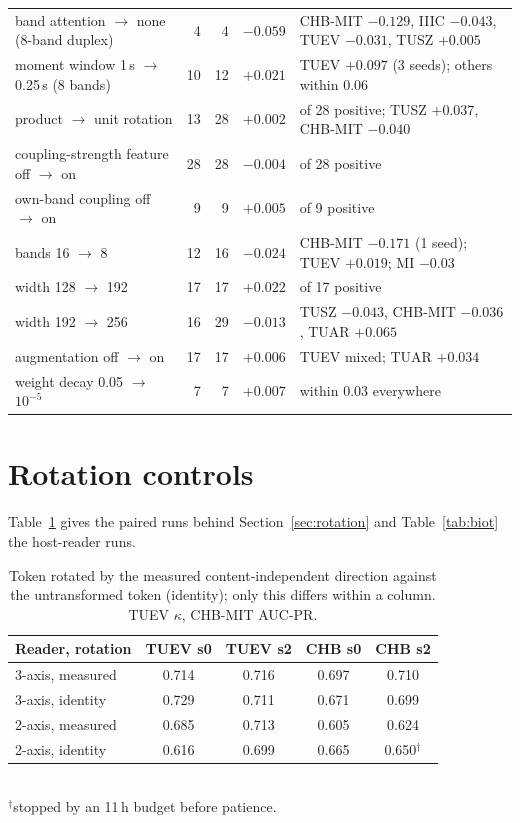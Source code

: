 \begin{table}[t]
\begin{tabular}{@{}>{\raggedright\arraybackslash}p{4.2cm}rrr>{\raggedright\arraybackslash}p{7.3cm}@{}}
band attention $\to$ none (8-band duplex) & 4 & 4 & $-0.059$ & CHB-MIT $-0.129$, IIIC $-0.043$, TUEV $-0.031$, TUSZ $+0.005$ \\
moment window 1\,s $\to$ 0.25\,s (8 bands) & 10 & 12 & $+0.021$ & TUEV $+0.097$ (3 seeds); others within 0.06 \\
product $\to$ unit rotation & 13 & 28 & $+0.002$ & 18 of 28 positive; TUSZ $+0.037$, CHB-MIT $-0.040$ \\
coupling-strength feature off $\to$ on & 28 & 28 & $-0.004$ & 12 of 28 positive \\
own-band coupling off $\to$ on & 9 & 9 & $+0.005$ & 4 of 9 positive \\
bands 16 $\to$ 8 & 12 & 16 & $-0.024$ & CHB-MIT $-0.171$ (1 seed); TUEV $+0.019$; MI $-0.03$ \\
width 128 $\to$ 192 & 17 & 17 & $+0.022$ & 12 of 17 positive \\
width 192 $\to$ 256 & 16 & 29 & $-0.013$ & TUSZ $-0.043$, CHB-MIT $-0.036$, TUAR $+0.065$ \\
augmentation off $\to$ on & 17 & 17 & $+0.006$ & TUEV mixed; TUAR $+0.034$ \\
weight decay 0.05 $\to$ $10^{-5}$ & 7 & 7 & $+0.007$ & within 0.03 everywhere \\
\bottomrule
\end{tabular}
\end{table}

\section{Rotation controls}
\label{sec:rotation_suppl}
Table~\ref{tab:rotation} gives the paired runs behind Section~\ref{sec:rotation} and Table~\ref{tab:biot} the host-reader runs.

\begin{table}[t]
\centering
\TableStyle
\caption{Token rotated by the measured content-independent direction against the untransformed token (identity); only this differs within a column. TUEV $\kappa$, CHB-MIT AUC-PR.}
\label{tab:rotation}
\setlength{\tabcolsep}{3pt}
\begin{tabular}{@{}lcccc@{}}
\toprule
Reader, rotation & TUEV s0 & TUEV s2 & CHB s0 & CHB s2 \\
\midrule
3-axis, measured & 0.714 & 0.716 & 0.697 & 0.710 \\
3-axis, identity & 0.729 & 0.711 & 0.671 & 0.699 \\
2-axis, measured & 0.685 & 0.713 & 0.605 & 0.624 \\
2-axis, identity & 0.616 & 0.699 & 0.665 & 0.650$^{\dagger}$ \\
\bottomrule
\end{tabular}
\\[2pt]{\scriptsize $^{\dagger}$stopped by an 11\,h budget before patience.}
\end{table}

